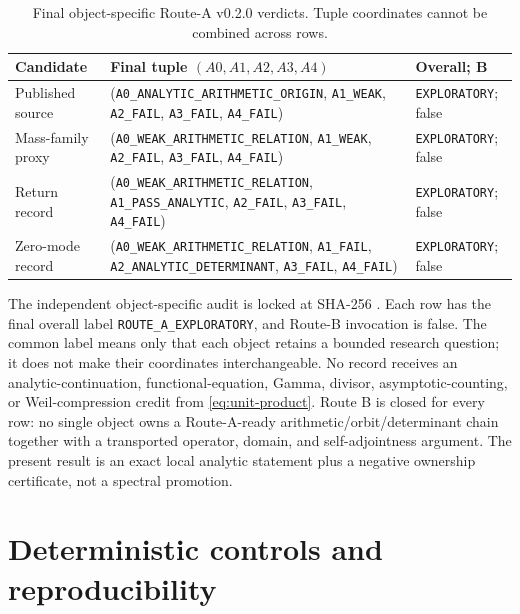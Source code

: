 \documentclass[11pt,a4paper]{article}
\theoremstyle{definition}
\begin{document}
\begin{table}[htbp]
\centering
\caption{Final object-specific Route-A v0.2.0 verdicts.  Tuple coordinates
cannot be combined across rows.}
\label{tab:route}
\scriptsize
\begin{tabularx}{\textwidth}{@{}p{}X p{}@{}}
\toprule
Candidate & Final tuple $(A0,A1,A2,A3,A4)$ & Overall; B \\
\midrule
Published source &
(\texttt{A0\_ANALYTIC\_ARITHMETIC\_ORIGIN}, \texttt{A1\_WEAK},
 \texttt{A2\_FAIL}, \texttt{A3\_FAIL}, \texttt{A4\_FAIL}) &
\texttt{EXPLORATORY}; false \\
Mass-family proxy &
(\texttt{A0\_WEAK\_ARITHMETIC\_RELATION}, \texttt{A1\_WEAK},
 \texttt{A2\_FAIL}, \texttt{A3\_FAIL}, \texttt{A4\_FAIL}) &
\texttt{EXPLORATORY}; false \\
Return record &
(\texttt{A0\_WEAK\_ARITHMETIC\_RELATION}, \texttt{A1\_PASS\_ANALYTIC},
 \texttt{A2\_FAIL}, \texttt{A3\_FAIL}, \texttt{A4\_FAIL}) &
\texttt{EXPLORATORY}; false \\
Zero-mode record &
(\texttt{A0\_WEAK\_ARITHMETIC\_RELATION}, \texttt{A1\_FAIL},
 \texttt{A2\_ANALYTIC\_DETERMINANT}, \texttt{A3\_FAIL},
 \texttt{A4\_FAIL}) &
\texttt{EXPLORATORY}; false \\
\bottomrule
\end{tabularx}
\end{table}

The independent object-specific audit is locked at SHA-256
.
Each row has the final overall label \texttt{ROUTE\_A\_EXPLORATORY}, and
Route-B invocation is false.  The common label means only that each object
retains a bounded research question; it does not make their coordinates
interchangeable.
No record receives an analytic-continuation, functional-equation, Gamma,
divisor, asymptotic-counting, or Weil-compression credit from
\eqref{eq:unit-product}.  Route B is closed for every row: no single object
owns a Route-A-ready arithmetic/orbit/determinant chain together with a
transported operator, domain, and self-adjointness argument.  The present
result is an exact local analytic statement plus a negative ownership
certificate, not a spectral promotion.

\section{Deterministic controls and reproducibility}
\label{sec:repro}
\end{document}
